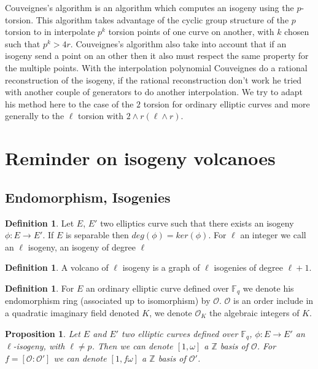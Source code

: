 \documentclass{article}
\theoremstyle{plain}
\newtheorem{prop}[thm]{Proposition}
\theoremstyle{definition}
\newtheorem{defi}[thm]{Definition}
\theoremstyle{remark}
\begin{document}
Couveignes's algorithm \cite{couveignes96} is an algorithm which computes an isogeny using the $p$-torsion. This algorithm takes advantage of the cyclic group structure of the $p$ torsion to in interpolate $p^k$ torsion points of one curve on another, with $k$ chosen such that $p^k>4r$. Couveignes's algorithm also take into account that if an isogeny send a point on an other then it also must respect the same property for the multiple points. With the interpolation polynomial Couveignes do a rational reconstruction of the isogeny, if the rational reconstruction don't work he tried with another couple of generators to do another interpolation. 
\newline
We try to adapt his method here to the case of the $2$ torsion for ordinary elliptic curves and more generally to the $\ell$ torsion with $2 \wedge r ( \ell \wedge r)$.


\section{Reminder on isogeny volcanoes}
\subsection{Endomorphism, Isogenies}
\begin{defi}
Let $E$, $E'$ two elliptics curve such that there exists an isogeny $\phi: E \rightarrow E'$. If $E$ is separable then $deg(\phi)=ker(\phi)$. For $\ell$ an integer we call an $\ell$ isogeny, an isogeny of degree $\ell$
\end{defi}

\begin{defi}
A volcano of $\ell$ isogeny is a graph of $\ell$ isogenies of degree $\ell+1$.
\end{defi}

\begin{defi}
For $E$ an ordinary elliptic curve defined over $\mathbb{F}_q$ we denote  his endomorphism ring (associated up to isomorphism) by $\mathcal{O}$. $\mathcal{O}$ is an order include in a quadratic imaginary field denoted $K$, we denote $\mathcal{O}_K$ the algebraic integers of $K$.
\end{defi}

\begin{prop}
Let $E$ and $E'$ two elliptic curves defined over $\mathbb{F}_q$, $\phi :E \rightarrow E'$ an $\ell$-isogeny, with $\ell \neq p$. Then we can denote $[1,\omega]$ a $\mathbb{Z}$ basis of $\mathcal{O}$. For $f=[\mathcal{O} : \mathcal{O}']$ we can denote $[1,f\omega]$ a $\mathbb{Z}$ basis of $\mathcal{O'}$.
\end{prop}
\end{document}
